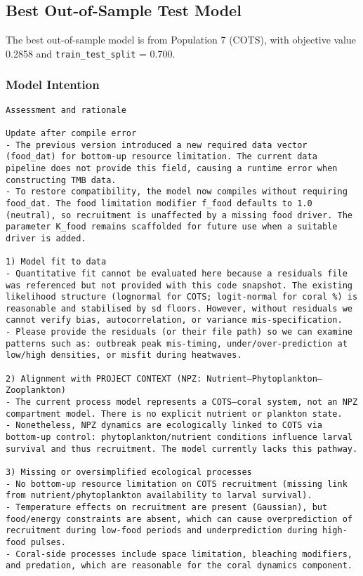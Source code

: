 \subsection{Best Out-of-Sample Test Model}
The best out-of-sample model is from Population 7 (COTS), with objective value 0.2858 and \texttt{train\_test\_split} = 0.700.

\subsubsection{Model Intention}
\begin{lstlisting}
Assessment and rationale

Update after compile error
- The previous version introduced a new required data vector (food_dat) for bottom-up resource limitation. The current data pipeline does not provide this field, causing a runtime error when constructing TMB data.
- To restore compatibility, the model now compiles without requiring food_dat. The food limitation modifier f_food defaults to 1.0 (neutral), so recruitment is unaffected by a missing food driver. The parameter K_food remains scaffolded for future use when a suitable driver is added.

1) Model fit to data
- Quantitative fit cannot be evaluated here because a residuals file was referenced but not provided with this code snapshot. The existing likelihood structure (lognormal for COTS; logit-normal for coral %) is reasonable and stabilised by sd floors. However, without residuals we cannot verify bias, autocorrelation, or variance mis-specification.
- Please provide the residuals (or their file path) so we can examine patterns such as: outbreak peak mis-timing, under/over-prediction at low/high densities, or misfit during heatwaves.

2) Alignment with PROJECT CONTEXT (NPZ: Nutrient–Phytoplankton–Zooplankton)
- The current process model represents a COTS–coral system, not an NPZ compartment model. There is no explicit nutrient or plankton state.
- Nonetheless, NPZ dynamics are ecologically linked to COTS via bottom-up control: phytoplankton/nutrient conditions influence larval survival and thus recruitment. The model currently lacks this pathway.

3) Missing or oversimplified ecological processes
- No bottom-up resource limitation on COTS recruitment (missing link from nutrient/phytoplankton availability to larval survival).
- Temperature effects on recruitment are present (Gaussian), but food/energy constraints are absent, which can cause overprediction of recruitment during low-food periods and underprediction during high-food pulses.
- Coral-side processes include space limitation, bleaching modifiers, and predation, which are reasonable for the coral dynamics component.


\end{lstlisting}
